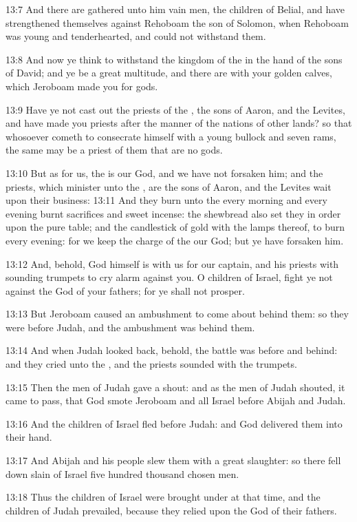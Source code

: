 13:7 And there are gathered unto him vain men, the children of Belial, and have strengthened themselves against Rehoboam the son of Solomon, when Rehoboam was young and tenderhearted, and could not withstand them.

13:8 And now ye think to withstand the kingdom of the \LORD in the hand of the sons of David; and ye be a great multitude, and there are with your golden calves, which Jeroboam made you for gods.

13:9 Have ye not cast out the priests of the \LORD, the sons of Aaron, and the Levites, and have made you priests after the manner of the nations of other lands? so that whosoever cometh to consecrate himself with a young bullock and seven rams, the same may be a priest of them that are no gods.

13:10 But as for us, the \LORD is our God, and we have not forsaken him; and the priests, which minister unto the \LORD, are the sons of Aaron, and the Levites wait upon their business: 13:11 And they burn unto the \LORD every morning and every evening burnt sacrifices and sweet incense: the shewbread also set they in order upon the pure table; and the candlestick of gold with the lamps thereof, to burn every evening: for we keep the charge of the \LORD our God; but ye have forsaken him.

13:12 And, behold, God himself is with us for our captain, and his priests with sounding trumpets to cry alarm against you. O children of Israel, fight ye not against the \LORD God of your fathers; for ye shall not prosper.

13:13 But Jeroboam caused an ambushment to come about behind them: so they were before Judah, and the ambushment was behind them.

13:14 And when Judah looked back, behold, the battle was before and behind: and they cried unto the \LORD, and the priests sounded with the trumpets.

13:15 Then the men of Judah gave a shout: and as the men of Judah shouted, it came to pass, that God smote Jeroboam and all Israel before Abijah and Judah.

13:16 And the children of Israel fled before Judah: and God delivered them into their hand.

13:17 And Abijah and his people slew them with a great slaughter: so there fell down slain of Israel five hundred thousand chosen men.

13:18 Thus the children of Israel were brought under at that time, and the children of Judah prevailed, because they relied upon the \LORD God of their fathers.

